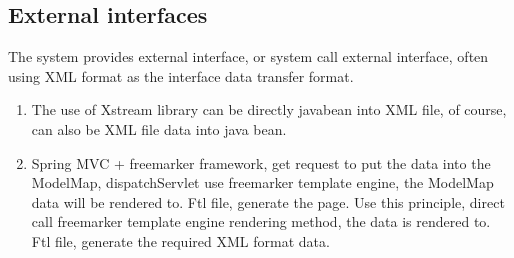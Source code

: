
\subsection{External interfaces}

The system provides external interface, or system call external interface, often using XML format as the interface data transfer format.

\begin{enumerate}
  \item The use of Xstream library can be directly javabean into XML file, of course, can also be XML file data into java bean.
  \item Spring MVC + freemarker framework, get request to put the data into the ModelMap, dispatchServlet use freemarker template engine, the ModelMap data will be rendered to. Ftl file, generate the page. Use this principle, direct call freemarker template engine rendering method, the data is rendered to. Ftl file, generate the required XML format data.
\end{enumerate}



